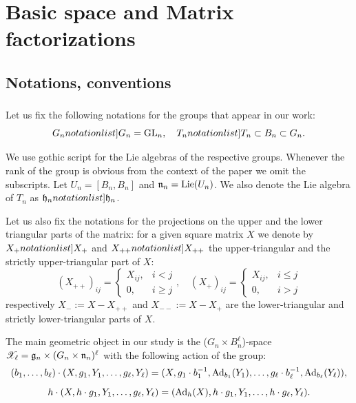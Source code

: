 \documentclass[10pt]{amsart}
\begin{document}
\section{Basic space and Matrix factorizations}\label{sec:notations}
\subsection{Notations, conventions}
\subsubsection{}Let us fix the following notations for the groups that appear in our work:
$$ \SymbolPrint{G_n}=\mathrm{GL}_n,\quad \SymbolPrint{T_n}\subset B_n\subset G_n.$$

 We use gothic script for the Lie algebras of the respective groups. Whenever the rank of the group is obvious from the context of the paper
we omit the subscripts.
Let \(U_n=[B_n,B_n]\) and \(\mathfrak{n}_n=\textup{Lie}(U_n)\). We also denote the Lie algebra of
$T_n$ as $\SymbolPrint{\mathfrak{h}_n}$.

Let us also fix the notations for the projections on the upper and the lower triangular parts of the matrix: for a given square matrix $X$ we denote by $\SymbolPrint{X_+}$  and
$\SymbolPrint{X_{++}}$ the
upper-triangular and the strictly upper-triangular part of $X$:
\[(X_{++})_{ij}=\begin{cases} X_{ij},& i<j\\
                            0,&i \ge j
                          \end{cases},\quad (X_{+})_{ij}=\begin{cases} X_{ij},&i\le j\\
                            0,&i>j
                          \end{cases}
                        \]
                        respectively $X_-:=X-X_{++}$ and $X_{--}:=X-X_+$ are the lower-triangular and strictly lower-triangular parts of $X$.




The main geometric object in our study is the ($G_n\times B_n^\ell$)-space $\mathscr{X}_\ell=\mathfrak{g}_n\times (G_n\times \mathfrak{n}_n)^\ell$ with the following action of the group:
$$ (b_1,\dots,b_\ell)\cdot (X,g_1,Y_1,\dots,g_\ell, Y_\ell)=(X,g_1\cdot b_1^{-1},{\rm Ad}_{b_1}(Y_1),\dots,g_\ell\cdot b_\ell^{-1},{\rm Ad}_{b_\ell}(Y_\ell)),$$
$$ h\cdot (X,h\cdot g_1,Y_1,\dots,g_\ell, Y_\ell)=({\rm Ad}_h(X),h\cdot g_1,Y_1,\dots,h\cdot g_\ell,Y_\ell).$$
\end{document}
